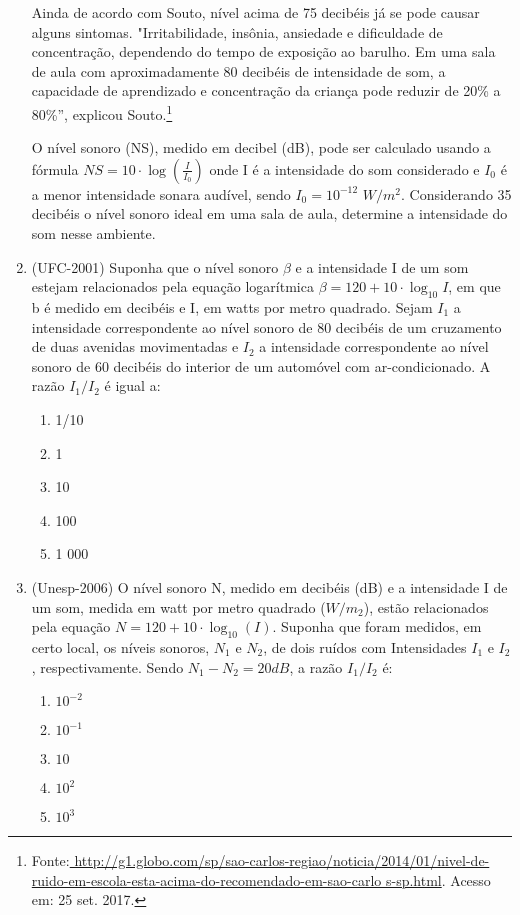 \begin{enumerate}
Ainda de acordo com Souto, nível acima de 75 decibéis já se pode causar alguns sintomas. "Irritabilidade, 
insônia, 
ansiedade e dificuldade de concentração, dependendo do tempo de exposição ao barulho. Em uma sala de aula com 
aproximadamente 80 decibéis de intensidade de som, a capacidade de aprendizado e concentração da criança pode reduzir de 
20{\%} a 80{\%}”, explicou 
Souto.\footnote{Fonte:\url{
http://g1.globo.com/sp/sao-carlos-regiao/noticia/2014/01/nivel-de-ruido-em-escola-esta-acima-do-recomendado-em-sao-carlo
s-sp.html}. Acesso em: 25 set. 2017.}

 O nível sonoro (NS), medido em decibel (dB), pode ser calculado usando a fórmula $NS=10\cdot \log(\frac{I}{I_0})$ onde I 
é a intensidade do som considerado e $I_0$ é a menor intensidade sonara audível, sendo  $I_0=10^{-12}$ $W/m^2$. 
Considerando 35 decibéis o nível sonoro ideal em uma sala de aula, determine a intensidade do som nesse ambiente.


\item {}\label{UFC2001}

(UFC-2001) Suponha que o nível sonoro $\beta$ e a intensidade I de um som estejam relacionados pela equação logarítmica 
$\beta = 120 + 10\cdot \log_{10} I$, em que b é medido em decibéis e I, em watts por metro quadrado. Sejam $I_1$ a 
intensidade correspondente ao nível sonoro de 80 decibéis de um cruzamento de duas avenidas movimentadas e $I_2$ a 
intensidade correspondente ao nível sonoro de 60 decibéis do interior de um automóvel com ar-condicionado. A razão 
$I_1/I_2$ é igual a:
 \begin{enumerate}

     \item 1/10
     \item 1
     \item 10 
     \item 100
     \item 1 000
 \end{enumerate}


\item {}\label{Unesp2006}

(Unesp-2006) O nível sonoro N, medido em decibéis (dB) e a intensidade I de um som, medida em watt por metro quadrado 
($W/m_2$), estão relacionados pela equação $N=120+10\cdot \log_{10} (I)$. Suponha que foram medidos, em certo local, os 
níveis sonoros, $N_1$ e $N_2$, de dois ruídos com Intensidades $I_1$ e $I_2$, respectivamente. Sendo $N_1 - N_2 = 20 dB$, 
a razão $I_1/I_2$ é:
\begin{enumerate}
    \item $10^{-2}$
    \item $10^{-1}$
     \item $10$
     \item $10^{2}$
     \item $10^{3}$
\end{enumerate}



\end{enumerate}
